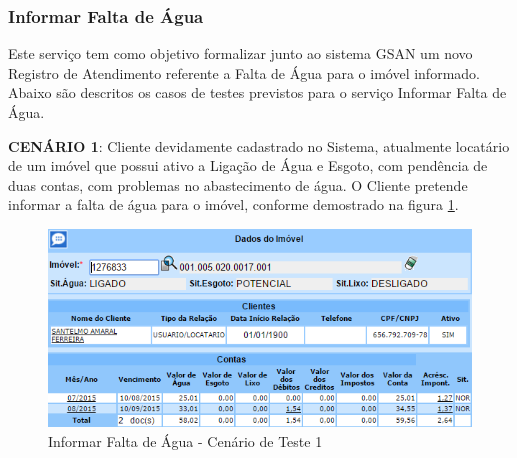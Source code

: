 \subsubsection{Informar Falta de Água}
Este serviço tem como objetivo formalizar junto ao sistema GSAN um novo Registro de Atendimento referente a Falta de Água para o imóvel informado.
Abaixo são descritos os casos de testes previstos para o serviço Informar Falta de Água.
\begin{flushleft}
	\begin{description}
		\item \textbf{CENÁRIO 1}: Cliente devidamente cadastrado no Sistema, atualmente locatário de um imóvel que possui ativo a Ligação de Água e Esgoto, com pendência de duas contas, com problemas no abastecimento de água. O Cliente pretende informar a falta de água para o imóvel, conforme demostrado na figura \ref{figura:informarFaltaAguaCenario1}.
		\begin{figure}[H]
			\centering
			\caption{Informar Falta de Água - Cenário de Teste 1}
			\label{figura:informarFaltaAguaCenario1}
			\includegraphics{figuras/cenarios/informar_falta_agua/cenario_1.PNG}
		\end{figure}
	\end{description}
	

\end{flushleft}

